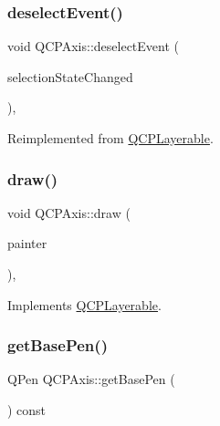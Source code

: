 \subsubsection{\texorpdfstring{deselect\+Event()}{deselectEvent()}}
{\footnotesize\ttfamily void Q\+C\+P\+Axis\+::deselect\+Event (\begin{DoxyParamCaption}\item[{bool $\ast$}]{selection\+State\+Changed }\end{DoxyParamCaption})\hspace{0.3cm}{\ttfamily [protected]}, {\ttfamily [virtual]}}



Reimplemented from \hyperlink{class_q_c_p_layerable_ae546370644a5551c76af739afc008bee}{Q\+C\+P\+Layerable}.

\mbox{\label{class_q_c_p_axis_ac15ebb4225ca5212d8e5fffae481bc9b}} 
\subsubsection{\texorpdfstring{draw()}{draw()}}
{\footnotesize\ttfamily void Q\+C\+P\+Axis\+::draw (\begin{DoxyParamCaption}\item[{\hyperlink{class_q_c_p_painter}{Q\+C\+P\+Painter} $\ast$}]{painter }\end{DoxyParamCaption})\hspace{0.3cm}{\ttfamily [protected]}, {\ttfamily [virtual]}}



Implements \hyperlink{class_q_c_p_layerable_aecf2f7087482d4b6a78cb2770e5ed12d}{Q\+C\+P\+Layerable}.

\mbox{\label{class_q_c_p_axis_a8cd3764c6a4ce9c3d7d913e81cad0a50}} 
\subsubsection{\texorpdfstring{get\+Base\+Pen()}{getBasePen()}}
{\footnotesize\ttfamily Q\+Pen Q\+C\+P\+Axis\+::get\+Base\+Pen (\begin{DoxyParamCaption}{ }\end{DoxyParamCaption}) const\hspace{0.3cm}{\ttfamily [protected]}}

